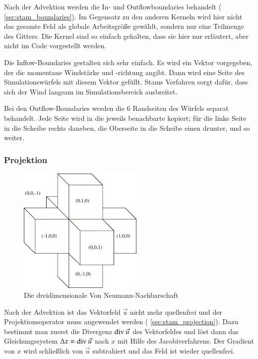 Nach der Advektion werden die In- und Outflowboundaries behandelt
(\Pimiddyvgl{} \cref{sec:stam_boundaries}). Im Gegensatz zu den anderen
Kerneln wird hier nicht das gesamte Feld als globale Arbeitsgröße
gewählt, sondern nur eine Teilmenge des Gitters. Die Kernel sind so
einfach gehalten, dass sie hier nur erläutert, aber nicht im Code
vorgestellt werden.

Die Inflow-Boundaries gestalten sich sehr einfach. Es wird ein Vektor
vorgegeben, der die momentane Windstärke und -richtung angibt. Dann
wird eine Seite des Simulationswürfels mit diesem Vektor
gefüllt. Stams Verfahren sorgt dafür, dass sich der Wind langsam im
Simulationsbereich ausbreitet.

Bei den Outflow-Boundaries werden die 6 Randseiten des Würfels separat
behandelt. Jede Seite wird in die jeweils benachbarte
 kopiert; für die linke Seite in die Scheibe
rechts daneben, die Oberseite in die Scheibe einen drunter, und so
weiter.

\subsubsection{Projektion}
\label{sec:implementation_wind_projection}

\begin{figure}[ht]
\centering
\includegraphics[width=6cm]{images/von_neumann}
\caption{Die dreidimensionale Von Neumann-Nachbarschaft}
\label{fig:implementation_wind_von_neumann_neighbors}
\end{figure}

Nach der Advektion ist das Vektorfeld $\vec{u}$ nicht mehr quellenfrei
und der Projektionsoperator muss angewendet werden
(\Pimiddyvgl{} \cref{sec:stam_projection}). Dazu bestimmt man zuerst die
Divergenz $\operatorname*{div} \vec{u}$ des Vektorfeldes und löst dann das
Gleichungssystem $\Delta x = \operatorname*{div} \vec{u}$ nach $x$
mit Hilfe des Jacobiverfahrens. Der Gradient von $x$ wird schließlich
von $\vec{u}$ subtrahiert und das Feld ist wieder quellenfrei.

